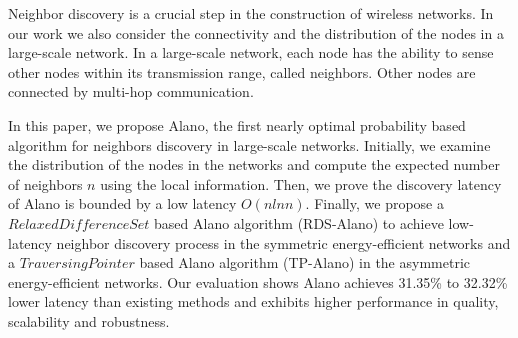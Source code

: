\begin{Abstract}

Neighbor discovery is a crucial step in the construction of wireless networks. 
In our work we also consider the connectivity and the distribution of the nodes in a large-scale network.
In a large-scale network, each node has the ability to sense other nodes within its transmission range,
called neighbors. Other nodes are connected by multi-hop communication.

In this paper, we propose Alano, the first nearly optimal probability 
based algorithm for neighbors discovery in large-scale networks. 
Initially, we examine the distribution of the nodes in the networks 
and compute the expected number of neighbors $n$ using the local information.
Then, we prove the discovery latency of Alano is bounded by a low latency $O(n ln n)$.
Finally, we propose a $Relaxed Difference Set$ based Alano algorithm (RDS-Alano) to 
achieve low-latency neighbor discovery process in the symmetric energy-efficient networks
and a $Traversing Pointer$ based Alano algorithm (TP-Alano) in the asymmetric energy-efficient networks.
Our evaluation shows Alano achieves 31.35\% to 32.32\% lower latency than existing methods 
and exhibits higher performance in quality, scalability and robustness.



\end{Abstract}
